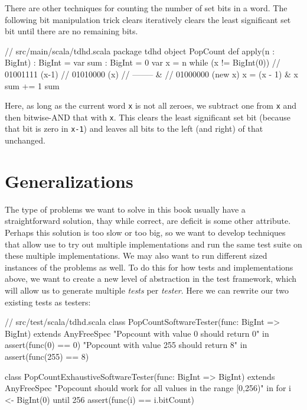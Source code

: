 \documentclass{tufte-book}
\begin{document}
There are other techniques for counting the number of set bits in a word. The following bit manipulation trick clears iteratively clears the least significant set bit until there are no remaining bits.
\begin{scalacode}
// src/main/scala/tdhd.scala
package tdhd
object PopCount {
  def apply(n : BigInt) : BigInt = {
    var sum : BigInt = 0
    var x = n
    while (x != BigInt(0)) {
      // 01001111   (x-1)
      // 01010000   (x)
      // -------- &
      // 01000000   (new x)
      x = (x - 1) & x
      sum += 1
    }
    sum
  }
}
\end{scalacode}
Here, as long as the current word {\tt x} is not all zeroes, we subtract one from {\tt x} and then bitwise-AND that with {\tt x}. This clears the least significant set bit (because that bit is zero in {\tt x-1}) and leaves all bits to the left (and right) of that unchanged.

\section{Generalizations}
The type of problems we want to solve in this book usually have a straightforward solution, thay while correct, are deficit is some other attribute. Perhaps this solution is too slow or too big, so we want to develop techniques that allow use to try out multiple implementations and run the same test suite on these multiple implementations. We may also want to run different sized instances of the problems as well. To do this for how tests and implementations above, we want to create a new level of abstraction in the test framework, which will allow us to generate multiple {\em tests} per {\em tester}.
Here we can rewrite our two existing tests as testers:
\begin{scalacode}
// src/test/scala/tdhd.scala
class PopCountSoftwareTester(func: BigInt => BigInt)
  extends AnyFreeSpec {
  "Popcount with value 0 should return 0" in {
    assert(func(0) == 0)
  }
  "Popcount with value 255 should return 8" in {
    assert(func(255) == 8)
  }
}

class PopCountExhaustiveSoftwareTester(func: BigInt => BigInt)
  extends AnyFreeSpec {
  "Popcount should work for all values in the range [0,256)" in {
    for { i <- BigInt(0) until 256 } {
      assert(func(i) == i.bitCount)
    }
  }
}
\end{scalacode}


\backmatter





\printindex
\end{document}
